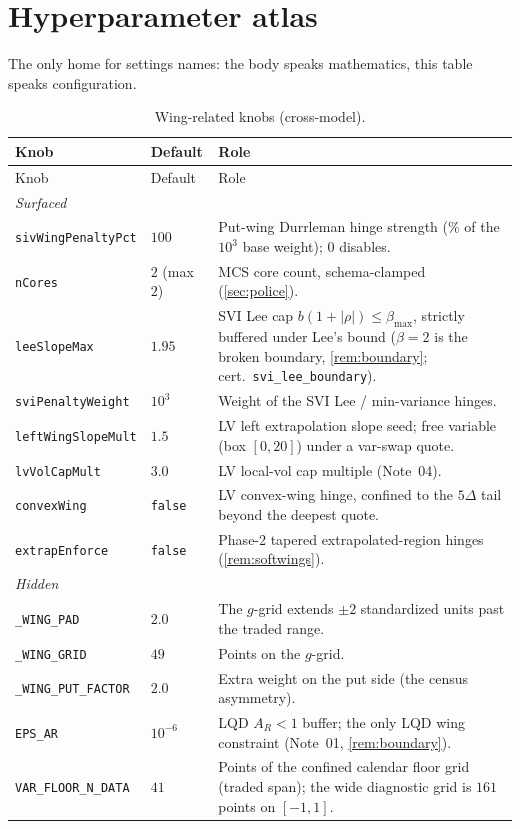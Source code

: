 \documentclass[11pt]{article}
\newcommand{\AR}{A_R}
\begin{document}
\appendix
\section{Hyperparameter atlas}
\label{app:atlas}

The only home for settings names: the body speaks mathematics, this
table speaks configuration.

\begin{longtable}{p{}p{}p{}}
\caption{Wing-related knobs (cross-model).}\label{tab:atlas}\\
\toprule Knob & Default & Role\\ \midrule
\endfirsthead \toprule Knob & Default & Role\\ \midrule \endhead
\multicolumn{3}{l}{\emph{Surfaced}}\\ \midrule
\texttt{sivWingPenaltyPct} & $100$ & Put-wing Durrleman hinge strength
(\% of the $10^{3}$ base weight); $0$ disables.\\
\texttt{nCores} & $2$ (max $2$) & MCS core count, schema-clamped
(\cref{sec:police}).\\
\texttt{leeSlopeMax} & $1.95$ & SVI Lee cap $b(1+|\rho|)\le\beta_{\max}$,
strictly buffered under Lee's bound ($\beta=2$ is the broken boundary,
\cref{rem:boundary}; cert.\ \texttt{svi\_lee\_boundary}).\\
\texttt{sviPenaltyWeight} & $10^{3}$ & Weight of the SVI Lee /
min-variance hinges.\\
\texttt{leftWingSlopeMult} & $1.5$ & LV left extrapolation slope seed;
free variable (box $[0,20]$) under a var-swap quote.\\
\texttt{lvVolCapMult} & $3.0$ & LV local-vol cap multiple (Note~04).\\
\texttt{convexWing} & \texttt{false} & LV convex-wing hinge, confined to
the $5\Delta$ tail beyond the deepest quote.\\
\texttt{extrapEnforce} & \texttt{false} & Phase-2 tapered
extrapolated-region hinges (\cref{rem:softwings}).\\
\midrule
\multicolumn{3}{l}{\emph{Hidden}}\\ \midrule
\texttt{\_WING\_PAD} & $2.0$ & The $g$-grid extends $\pm2$ standardized
units past the traded range.\\
\texttt{\_WING\_GRID} & $49$ & Points on the $g$-grid.\\
\texttt{\_WING\_PUT\_FACTOR} & $2.0$ & Extra weight on the put side
(the census asymmetry).\\
\texttt{EPS\_AR} & $10^{-6}$ & LQD $\AR<1$ buffer; the only LQD wing
constraint (Note~01, \cref{rem:boundary}).\\
\texttt{VAR\_FLOOR\_N\_DATA} & $41$ & Points of the confined calendar
floor grid (traded span); the wide diagnostic grid is $161$ points on
$[-1,1]$.\\
\bottomrule
\end{longtable}
\end{document}
